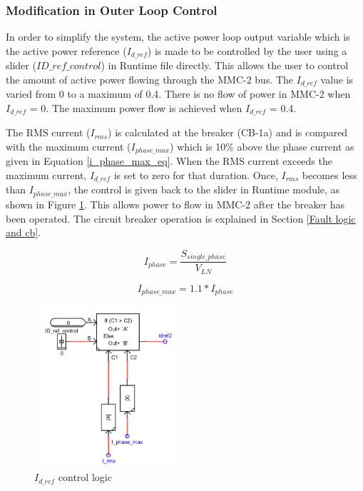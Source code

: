 \subsubsection{Modification in Outer Loop Control}
In order to simplify the system, the active power loop output variable which is the active power reference ($I_{d\_ref}$) is made to be controlled by the user using a slider ($ID\_ref\_control$) in Runtime file directly. This allows the user to control the amount of active power flowing through the \gls{MMC}-2 bus. The $I_{d\_ref}$ value is varied from 0 to a maximum of 0.4. There is no flow of power in \gls{MMC}-2 when $I_{d\_ref}$ = 0. The maximum power flow is achieved when $I_{d\_ref}$ = 0.4. %

The RMS current ($I_{rms}$) is calculated at the breaker (CB-1a) and is compared with the maximum current ($I_{phase\_max}$) which is 10\% above the phase current as given in Equation \ref{i_phase_max_eq}. When the RMS current exceeds the maximum current, $I_{d\_ref}$ is set to zero for that duration. Once, $I_{rms}$ becomes less than $I_{phase\_max}$, the control is given back to the slider in Runtime module, as shown in Figure \ref{fig:Idref_control}. This allows power to flow in \gls{MMC}-2 after the breaker has been operated. The circuit breaker operation is explained in Section \ref{Fault logic and cb}.

\begin{equation}
    I_{phase} = \frac{S_{single\_phase}}{V_{LN}}
\end{equation}

\begin{equation}\label{i_phase_max_eq}
    I_{phase\_max} = 1.1 * I_{phase}
\end{equation}

\begin{figure}[H]
\centering
    \includegraphics[height = 6cm,width = 5.5cm]{Diagrams/Chapter_4/Idref_control.PNG}
    \caption{$I_{d\_ref}$ control logic}
    \label{fig:Idref_control}
\end{figure}
